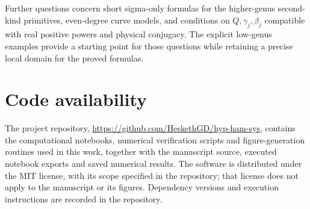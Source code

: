 \documentclass[11pt]{article}
\begin{document}
Further questions concern short sigma-only formulas for the higher-genus second-kind primitives, even-degree curve models, and conditions on $Q,\gamma_j,\beta_j$ compatible with real positive powers and physical conjugacy. The explicit low-genus examples provide a starting point for those questions while retaining a precise local domain for the proved formulas.

\section*{Code availability}

The project repository, \url{https://github.com/HeskethGD/hyp-ham-sys}, contains the computational notebooks, numerical verification scripts and figure-generation routines used in this work, together with the manuscript source, executed notebook exports and saved numerical results.
The software is distributed under the MIT license, with its scope specified in the repository; that license does not apply to the manuscript or its figures. Dependency versions and execution instructions are recorded in the repository.
\end{document}
